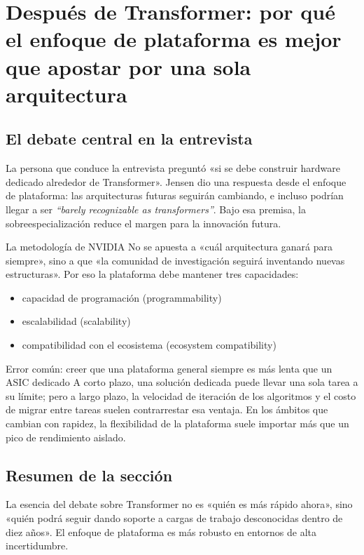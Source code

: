 \section{Después de Transformer: por qué el enfoque de plataforma es mejor que apostar por una sola arquitectura}

\subsection{El debate central en la entrevista}

La persona que conduce la entrevista preguntó «si se debe construir hardware dedicado alrededor de Transformer». Jensen dio una respuesta desde el enfoque de plataforma: las arquitecturas futuras seguirán cambiando, e incluso podrían llegar a ser \textit{``barely recognizable as transformers''}. Bajo esa premisa, la sobreespecialización reduce el margen para la innovación futura.

\begin{importantbox}{La metodología de NVIDIA}
No se apuesta a «cuál arquitectura ganará para siempre», sino a que «la comunidad de investigación seguirá inventando nuevas estructuras». Por eso la plataforma debe mantener tres capacidades:
\begin{itemize}
    \item capacidad de programación (programmability)
    \item escalabilidad (scalability)
    \item compatibilidad con el ecosistema (ecosystem compatibility)
\end{itemize}
\end{importantbox}

\begin{warningbox}{Error común: creer que una plataforma general siempre es más lenta que un ASIC dedicado}
A corto plazo, una solución dedicada puede llevar una sola tarea a su límite; pero a largo plazo, la velocidad de iteración de los algoritmos y el costo de migrar entre tareas suelen contrarrestar esa ventaja. En los ámbitos que cambian con rapidez, la flexibilidad de la plataforma suele importar más que un pico de rendimiento aislado.
\end{warningbox}

\subsection{Resumen de la sección}
La esencia del debate sobre Transformer no es «quién es más rápido ahora», sino «quién podrá seguir dando soporte a cargas de trabajo desconocidas dentro de diez años». El enfoque de plataforma es más robusto en entornos de alta incertidumbre.


